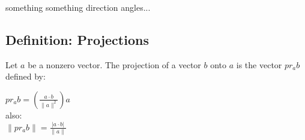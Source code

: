 \documentclass{article} %
\begin{document}
    something something direction angles...\\

    \subsection*{Definition: Projections}
    Let $a$ be a nonzero vector. The projection of a vector $b$ onto $a$ is the vector $pr_ab$ defined by:
    \begin{center}
        $pr_ab = (\frac{a\cdot b}{\|a\|^2})a$\\
        also:\\
        $\|pr_ab\|=\frac{|a\cdot b|}{\|a\|}$
        
        
    \end{center}
    
    
    
    

    
    
    
    
    
    
    
    
    
    
    
    
    
    
    
    
    
    
\end{document}
